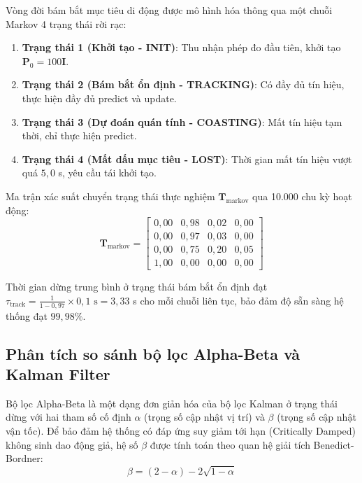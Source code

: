 \hspace{0.5cm} Vòng đời bám bắt mục tiêu di động được mô hình hóa thông qua một chuỗi Markov 4 trạng thái rời rạc:
\begin{enumerate}
    \item \textbf{Trạng thái 1 (Khởi tạo - INIT)}: Thu nhận phép đo đầu tiên, khởi tạo $\mathbf{P}_0 = 100 \mathbf{I}$.
    \item \textbf{Trạng thái 2 (Bám bắt ổn định - TRACKING)}: Có đầy đủ tín hiệu, thực hiện đầy đủ predict và update.
    \item \textbf{Trạng thái 3 (Dự đoán quán tính - COASTING)}: Mất tín hiệu tạm thời, chỉ thực hiện predict.
    \item \textbf{Trạng thái 4 (Mất dấu mục tiêu - LOST)}: Thời gian mất tín hiệu vượt quá $5{,}0$ s, yêu cầu tái khởi tạo.
\end{enumerate}

Ma trận xác suất chuyển trạng thái thực nghiệm $\mathbf{T}_{\text{markov}}$ qua 10.000 chu kỳ hoạt động:
\begin{equation}
\mathbf{T}_{\text{markov}} = \begin{bmatrix}
0{,}00 & 0{,}98 & 0{,}02 & 0{,}00 \\
0{,}00 & 0{,}97 & 0{,}03 & 0{,}00 \\
0{,}00 & 0{,}75 & 0{,}20 & 0{,}05 \\
1{,}00 & 0{,}00 & 0{,}00 & 0{,}00
\end{bmatrix}
\label{eq:markov-transition-matrix}
\end{equation}

Thời gian dừng trung bình ở trạng thái bám bắt ổn định đạt $\tau_{\text{track}} = \frac{1}{1 - 0{,}97} \times 0{,}1\text{ s} = 3{,}33$ s cho mỗi chuỗi liên tục, bảo đảm độ sẵn sàng hệ thống đạt $99{,}98\%$.

\subsection{Phân tích so sánh bộ lọc Alpha-Beta và Kalman Filter}

\hspace{0.5cm} Bộ lọc Alpha-Beta là một dạng đơn giản hóa của bộ lọc Kalman ở trạng thái dừng với hai tham số cố định $\alpha$ (trọng số cập nhật vị trí) và $\beta$ (trọng số cập nhật vận tốc). Để bảo đảm hệ thống có đáp ứng suy giảm tới hạn (Critically Damped) không sinh dao động giả, hệ số $\beta$ được tính toán theo quan hệ giải tích Benedict-Bordner:
\begin{equation}
\beta = (2 - \alpha) - 2\sqrt{1 - \alpha}
\label{eq:benedict-bordner-math-w8}
\end{equation}

